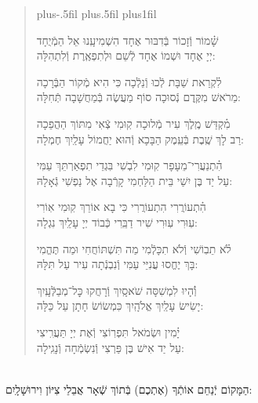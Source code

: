 \documentclass[twoside, openany, parskip=half, 11pt]{book}
\begin{document}
\begin{quote}
\leftskip=0pt plus-.5fil
\rightskip=0pt plus.5fil
\parfillskip=0pt plus1fil


\lechadodi

שָׁ֗מוֹר וְֿזָכוֹר בְּֿדִבּוּר אֶחָד \hfill
הִשְׁמִיעָֽנוּ אֵל הַמְֿיֻחָד \\
יְיָ אֶחָד וּשְׁמוֹ אֶחָד \hfill
לְֿשֵׁם וּלְתִפְאֶֽרֶת וְֿלִתְהִלָּה:

\lechadodi

לִ֗קְרַאת שַׁבָּת לְֿכוּ וְֿנֵלְֿכָה \hfill
כִּי הִיא מְֿקוֹר הַבְּֿרָכָה \\
מֵרֹאשׁ מִקֶּֽדֶם נְֿסוּכָה \hfill
סוֹף מַעֲשֶׂה בְּֿמַחֲשָׁבָה תְּֿחִלָּה:

\lechadodi

מִ֗קְדַּשׁ מֶֽלֶךְ עִיר מְֿלוּכָה \hfill
קֽוּמִי צְֿאִי מִתּוֹךְ הַהֲפֵכָה \\
רַב לָךְ שֶֽׁבֶת בְּֿעֵֽמֶק הַבָּכָא \hfill
וְֿהוּא יַחֲמוֹל עָלַֽיִךְ חֶמְלָה:

\lechadodi

הִ֗תְנַעֲרִי־מֵעָפָר קֽוּמִי \hfill
לִבְשִׁי בִּגְדֵי תִפְאַרְתֵּךְ עַמִּי \\
עַל יַד בֶּן יִשַׁי בֵּית הַלַּחְמִי \hfill
קָרְֿבָה אֶל נַפְשִׁי גְֿאָלָהּ:

\lechadodi

הִ֗תְעוֹרֲרִי הִתְעוֹרֲרִי \hfill
כִּי בָא אוֹרֵךְ קֽוּמִי אֽוֹרִי \\
עֽוּרִי עֽוּרִי שִׁיר דַבֵּֽרִי \hfill
כְּֿבוֹד יְיָ עָלַֽיִךְ נִגְלָה:

\lechadodi

לֹ֗א תֵבֽוֹשִׁי וְֿלֹא תִכָּלְֿמִי \hfill
מַה תִּשְׁתּוֹחֲחִי וּמַה תֶּהֱמִי \\
בָּךְ יֶחֱסוּ עֲנִיֵּי עַמִּי \hfill
וְֿנִבְנְֿתָה עִיר עַל תִּלָּהּ:

\lechadodi

וְֿ֗הָיוּ לִמְשִׁסָּה שֹׁאסָֽיִךְ \hfill
וְֿרָחֲקוּ כׇּל־מְבַלְּֿעָֽיִךְ \\
יָשִׂישׂ עָלַֽיִךְ אֱלֹהָֽיִךְ \hfill
כִּמְשׂוֹשׂ חָתָן עַל כַּלָּה:

\lechadodi

יָ֗מִין וּשְׂמֹאל תִּפְרֽוֹצִי \hfill
וְֿאֶת יְיָ תַּעֲרִֽיצִי \\
עַל יַד אִישׁ בֶּן פַּרְצִי \hfill
וְֿנִשְׂמְֿחָה וְֿנָגִֽילָה:

\lechadodi

\end{quote}

\begin{sometimes}

\\
הַמָּקוֹם יְֿנַחֵם אוֹתְֿךָ (אֶתְכֶם) בְּֿתוֹךְ שְֿׁאָר אֲבֵלֵי צִיּוֹן וִירוּשָׁלָֽיִם:

\end{sometimes}
\end{document}
